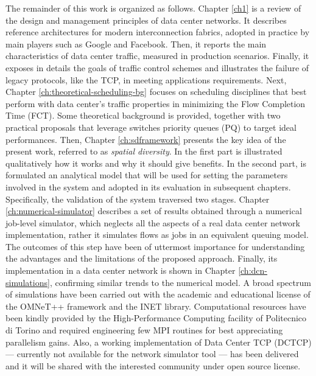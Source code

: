 The remainder of this work is organized as follows. Chapter \ref{ch1} is a review of the design and management principles of data center networks. It describes reference architectures for modern interconnection fabrics, adopted in practice by main players such as Google and Facebook. Then, it reports the main characteristics of data center traffic, measured in production scenarios. Finally, it exposes in details the goals of traffic control schemes and illustrates the failure of legacy protocols, like the TCP, in meeting applications requirements. Next, Chapter \ref{ch:theoretical-scheduling-bg} focuses on scheduling disciplines that best perform with data center's traffic properties in minimizing the Flow Completion Time (FCT). Some theoretical background is provided, together with two practical proposals that leverage switches priority queues (PQ) to target ideal performances. Then, Chapter \ref{ch:sdframework} presents the key idea of the present work, referred to as \emph{spatial diversity}. In the first part is illustrated qualitatively how it works and why it should give benefits. In the second part, is formulated an analytical model that will be used for setting the parameters involved in the system and adopted in its evaluation in subsequent chapters. Specifically, the validation of the system traversed two stages. Chapter \ref{ch:numerical-simulator} describes a set of results obtained through a numerical job-level simulator, which neglects all the aspects of a real data center network implementation, rather it simulates flows as jobs in an equivalent queuing model. The outcomes of this step have been of uttermost importance for understanding the advantages and the limitations of the proposed approach. Finally, its implementation in a data center network is shown in Chapter \ref{ch:dcn-simulations}, confirming similar trends to the numerical model. A broad spectrum of simulations have been carried out with the academic and educational license of the OMNeT++ framework and the INET library. Computational resources have been kindly provided by the High-Performance Computing facility of Politecnico di Torino and required engineering few MPI routines for best appreciating parallelism gains. Also, a working implementation of Data Center TCP (DCTCP) --- currently not available for the network simulator tool ---  has been delivered and it will be shared with the interested community under open source license.

